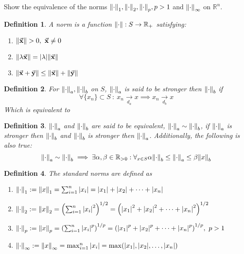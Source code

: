 \documentclass[]{article}
\newcommand{\R}{\mathbb{R}}
\newcommand{\st}{\ : \ }
\newtheorem{definition}{Definition}
\begin{document}
\section{}
Show the equivalence of the norms $\norm{\cdot}_1,\norm{\cdot}_2,\norm{\cdot}_p, p>1$ and $\norm{\cdot}_\infty$ on $\R^n$.
\begin{definition}
    A \emph{norm} is a function $\norm{\cdot} : S \to \R_+$ satisfying:
    \begin{enumerate}
        \item $\norm{\va{x}} > 0, \ \va{x} \neq 0$
        \item $\norm{\lambda \va{x}} = \abs{\lambda} \norm{\va{x}}$
        \item $\norm{\va{x} + \va{y}} \leq \norm{\va{x}} + \norm{\va{y}}$
    \end{enumerate}
\end{definition}
\begin{definition}
    For $\norm{\cdot}_a, \norm{\cdot}_b$ on $S$, 
    $\norm{\cdot}_a$ is said to be \emph{stronger} then $\norm{\cdot}_b$ if 
    \[\forall \{x_n\} \subset S \st x_n \xrightarrow[d_a]{} x \implies x_n \xrightarrow[d_b]{} x\]
    Which is equivalent to 
\end{definition}
\begin{definition}
    $\norm{\cdot}_a$ and $\norm{\cdot}_b$ are said to be \emph{equivalent},  $\norm{\cdot}_a \sim \norm{\cdot}_b$,
    if $\norm{\cdot}_a$ is stronger then $\norm{\cdot}_b$ 
    and $\norm{\cdot}_b$ is stronger then $\norm{\cdot}_a$. 
    Additionally, the following is also true: 
    \[
        \norm{\cdot}_a \sim \norm{\cdot}_b 
            \implies \exists{\alpha,\beta \in \R_{>0}} : 
            \forall_{x\in S} \alpha \norm{\cdot}_b \leq \norm{\cdot}_a \leq \beta \norm{x}_b
    \]
\end{definition}

\begin{definition} The standard norms are defined as
    \begin{enumerate}
        \item $\norm{\cdot}_1 := \norm{x}_1 = \sum_{i=1}^n \abs{x_i} = \abs{x_1} + \abs{x_2} + \dots + \abs{x_n}$
        \item $\norm{\cdot}_2 := \norm{x}_2 = \qty(\sum_{i=1}^n \abs{x_i}^2)^{1/2} = \qty(\abs{x_1}^2 + \abs{x_2}^2 + \dots + \abs{x_n}^2)^{1/2}$
        \item $\norm{\cdot}_p := \norm{x}_p = \qty(\sum_{i=1}^n \abs{x_i}^p)^{1/p} =\qty(\abs{x_1}^p + \abs{x_2}^p + \dots + \abs{x_n}^p)^{1/p}, \ p > 1$
        \item $\norm{\cdot}_\infty := \norm{x}_\infty = \max_{i=1}^n \abs{x_i} = \max(\abs{x_1}, \abs{x_2}, \dots, \abs{x_n})$
    \end{enumerate}
\end{definition}
\end{document}
